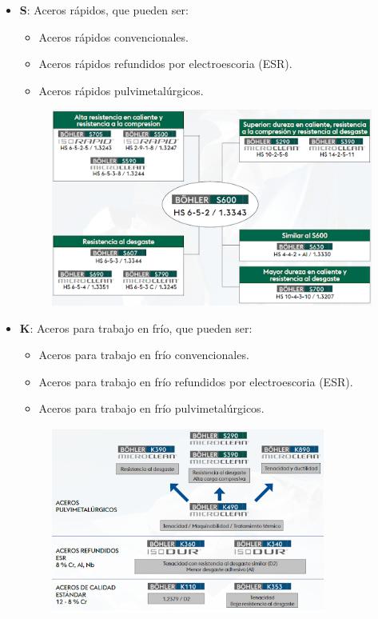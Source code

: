 \documentclass[12pt,a4paper]{article}
\begin{document}
\begin{itemize}
    \item \textbf{S}: Aceros rápidos, que pueden ser:
    \begin{itemize}
        \item Aceros rápidos convencionales.
        \item Aceros rápidos refundidos por electroescoria (ESR).
        \item Aceros rápidos pulvimetalúrgicos.
    \end{itemize}
        \begin{figure}[H]    
        \centering         
        \includegraphics[width=0.85\linewidth]{Inagenes para latex/1.png}
    \end{figure}
    \item \textbf{K}: Aceros para trabajo en frío, que pueden ser:
    \begin{itemize}
        \item Aceros para trabajo en frío convencionales.
        \item Aceros para trabajo en frío refundidos por electroescoria (ESR).
        \item Aceros para trabajo en frío pulvimetalúrgicos.
    \end{itemize}
    \begin{figure}[H]    
        \centering         
        \includegraphics[width=0.85\textwidth]{Inagenes para latex/2.png}

\end{figure}
\end{itemize}
\end{document}
